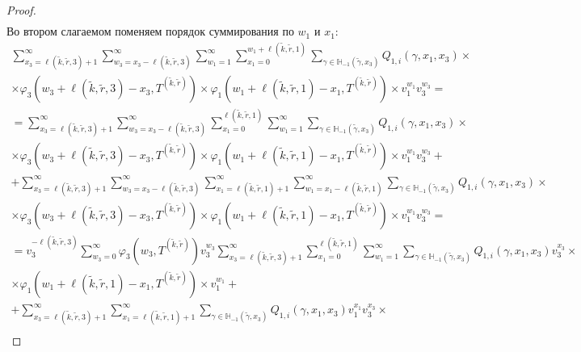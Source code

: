\documentclass[a4paper,12pt,russian]{extarticle}
\begin{document}
\begin{proof}
\begin{multline*}
\end{multline*}
Во втором слагаемом поменяем порядок суммирования по $w_1$ и $x_1$:
\begin{multline*}
   \sum_{x_3=\ell(\tilde{k},\tilde{r},3)+1}^{\infty}\sum_{w_3=x_3 -\ell(\tilde{k},\tilde{r},3) }^{\infty} \sum_{w_1=1}^{\infty} \sum_{x_1=0}^{w_1+\ell(\tilde{k},\tilde{r},1)}   \sum_{\gamma \in {\mathbb H}_{-1}(\tilde{\gamma},x_3)}Q_{1,i}(\gamma,x_1, x_3) \times  \\
   \times \varphi_3(w_3 + \ell(\tilde{k},\tilde{r},3) - x_3,T^{(\tilde{k},\tilde{r})})  \times \varphi_1(w_1 + \ell(\tilde{k},\tilde{r},1) - x_1,T^{(\tilde{k},\tilde{r})})  \times v_1^{w_1} v_3^{w_3} = \\ 
   = \sum_{x_3=\ell(\tilde{k},\tilde{r},3)+1}^{\infty}\sum_{w_3=x_3 -\ell(\tilde{k},\tilde{r},3) }^{\infty} \sum_{x_1=0}^{\ell(\tilde{k},\tilde{r},1)}  \sum_{w_1=1}^{\infty}   \sum_{\gamma \in {\mathbb H}_{-1}(\tilde{\gamma},x_3)}Q_{1,i}(\gamma,x_1, x_3) \times  \\
   \times \varphi_3(w_3 + \ell(\tilde{k},\tilde{r},3) - x_3,T^{(\tilde{k},\tilde{r})})  \times \varphi_1(w_1 + \ell(\tilde{k},\tilde{r},1) - x_1,T^{(\tilde{k},\tilde{r})})  \times v_1^{w_1} v_3^{w_3} + \\
   +\sum_{x_3=\ell(\tilde{k},\tilde{r},3)+1}^{\infty}\sum_{w_3=x_3 -\ell(\tilde{k},\tilde{r},3) }^{\infty} \sum_{x_1=\ell(\tilde{k},\tilde{r},1)+1}^{\infty}  \sum_{w_1=x_1-\ell(\tilde{k},\tilde{r},1)}^{\infty}  \sum_{\gamma \in {\mathbb H}_{-1}(\tilde{\gamma},x_3)}Q_{1,i}(\gamma,x_1, x_3) \times  \\
   \times \varphi_3(w_3 + \ell(\tilde{k},\tilde{r},3) - x_3,T^{(\tilde{k},\tilde{r})})  \times \varphi_1(w_1 + \ell(\tilde{k},\tilde{r},1) - x_1,T^{(\tilde{k},\tilde{r})})  \times v_1^{w_1} v_3^{w_3}= \\    
   = v_3^{-\ell(\tilde{k},\tilde{r},3)}\sum_{w_3=0 }^{\infty}\varphi_3(w_3,T^{(\tilde{k},\tilde{r})}) v_3^{w_3} \sum_{x_3=\ell(\tilde{k},\tilde{r},3)+1}^{\infty}  \sum_{x_1=0}^{\ell(\tilde{k},\tilde{r},1)}  \sum_{w_1=1}^{\infty}   \sum_{\gamma \in {\mathbb H}_{-1}(\tilde{\gamma},x_3)}Q_{1,i}(\gamma,x_1, x_3) v_3^{x_3}\times  \\
   \times  \varphi_1(w_1 + \ell(\tilde{k},\tilde{r},1) - x_1,T^{(\tilde{k},\tilde{r})})  \times v_1^{w_1}  + \\
   +\sum_{x_3=\ell(\tilde{k},\tilde{r},3)+1}^{\infty} \sum_{x_1=\ell(\tilde{k},\tilde{r},1)+1}^{\infty}    \sum_{\gamma \in {\mathbb H}_{-1}(\tilde{\gamma},x_3)}Q_{1,i}(\gamma,x_1, x_3) v_1^{x_1} v_3^{ x_3} \times  \\

\end{multline*}
\end{proof}
\end{document}
